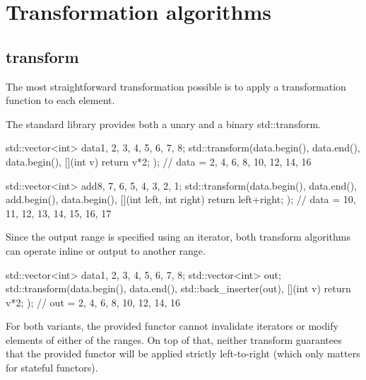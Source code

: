 \section{Transformation algorithms}

\subsection{transform}

The most straightforward transformation possible is to apply a transformation function to each element.




The standard library provides both a unary and a binary std::transform.

\begin{box-note}
\begin{cppcode}
std::vector<int> data{1, 2, 3, 4, 5, 6, 7, 8};
std::transform(data.begin(), data.end(),
               data.begin(), [](int v) { return v*2; });
// data = {2, 4, 6, 8, 10, 12, 14, 16}

std::vector<int> add{8, 7, 6, 5, 4, 3, 2, 1};
std::transform(data.begin(), data.end(), add.begin(),
               data.begin(), [](int left, int right) {
                  return left+right; });
// data = {10, 11, 12, 13, 14, 15, 16, 17}
\end{cppcode}
\end{box-note}

Since the output range is specified using an iterator, both transform algorithms can operate inline or output to another range.

\begin{box-note}
\begin{cppcode}
std::vector<int> data{1, 2, 3, 4, 5, 6, 7, 8};
std::vector<int> out;
std::transform(data.begin(), data.end(),
    std::back_inserter(out), [](int v) { return v*2; });
// out = {2, 4, 6, 8, 10, 12, 14, 16}
\end{cppcode}
\end{box-note}

For both variants, the provided functor cannot invalidate iterators or modify elements of either of the ranges. On top of that, neither transform guarantees that the provided functor will be applied strictly left-to-right (which only matters for stateful functors).

